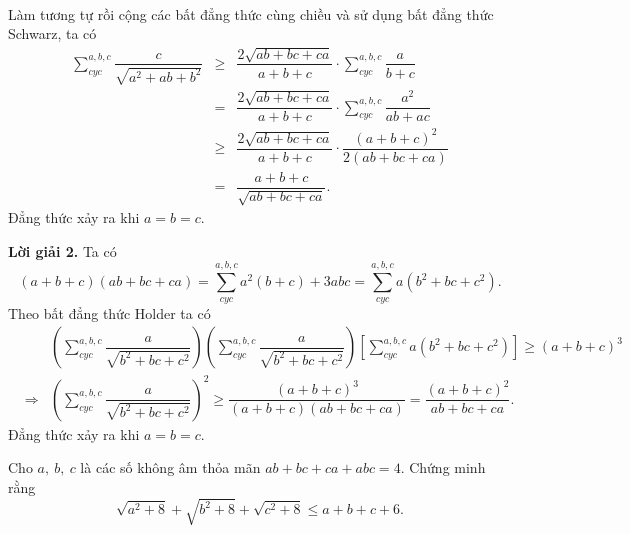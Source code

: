 {\begin{bt}
{\begin{enumEX}[1)]{1}
\begin{eqnarray*}
			\end{eqnarray*}
			Làm tương tự rồi cộng các bất đẳng thức cùng chiều và sử dụng bất đẳng thức Schwarz, ta có
			\begin{eqnarray*}
				\displaystyle\sum\limits_{cyc}^{a,b,c}\dfrac{c}{\sqrt{a^{2}+ab+b^{2}}}&\geq& \dfrac{2\sqrt{ab+bc+ca}}{a+b+c}\cdot \displaystyle\sum\limits_{cyc}^{a,b,c}\dfrac{a}{b+c}\\
				&=& \dfrac{2\sqrt{ab+bc+ca}}{a+b+c}\cdot \displaystyle\sum\limits_{cyc}^{a,b,c}\dfrac{a^{2}}{ab+ac}\\
				&\geq& \dfrac{2\sqrt{ab+bc+ca}}{a+b+c}\cdot \dfrac{(a+b+c)^{2}}{2(ab+bc+ca)}\\
				&=&\dfrac{a+b+c}{\sqrt{ab+bc+ca}}.
			\end{eqnarray*}
			Đẳng thức xảy ra khi $ a=b=c $.
			\item \textbf{Lời giải 2.} Ta có
			\[ 
			(a+b+c)(ab+bc+ca)=\displaystyle\sum\limits_{cyc}^{a,b,c}a^{2}(b+c)+3abc=\displaystyle\sum\limits_{cyc}^{a,b,c}a(b^{2}+bc+c^{2}).
			\]
			Theo bất đẳng thức Holder ta có
			\begin{eqnarray*}
				&&\left(\displaystyle\sum\limits_{cyc}^{a,b,c}\dfrac{a}{\sqrt{b^{2}+bc+c^{2}}}\right)\left(\displaystyle\sum\limits_{cyc}^{a,b,c}\dfrac{a}{\sqrt{b^{2}+bc+c^{2}}}\right)\left[\displaystyle\sum\limits_{cyc}^{a,b,c}a(b^{2}+bc+c^{2})\right]\geq (a+b+c)^{3}\\
				&\Rightarrow&\left(\displaystyle\sum\limits_{cyc}^{a,b,c}\dfrac{a}{\sqrt{b^{2}+bc+c^{2}}}\right)^{2}\geq \dfrac{(a+b+c)^{3}}{(a+b+c)(ab+bc+ca)}=\dfrac{(a+b+c)^{2}}{ab+bc+ca}.
			\end{eqnarray*}
			Đẳng thức xảy ra khi $ a=b=c $.
		\end{enumEX}	
	}
\end{bt}
\begin{bt}%
	Cho $ a,\ b,\ c $ là các số không âm thỏa mãn $ ab+bc+ca+abc=4 $. Chứng minh rằng
	\[ 
	\sqrt{a^{2}+8}+\sqrt{b^{2}+8}+\sqrt{c^{2}+8}\leq a+b+c+6.
	\]
\end{bt}}
